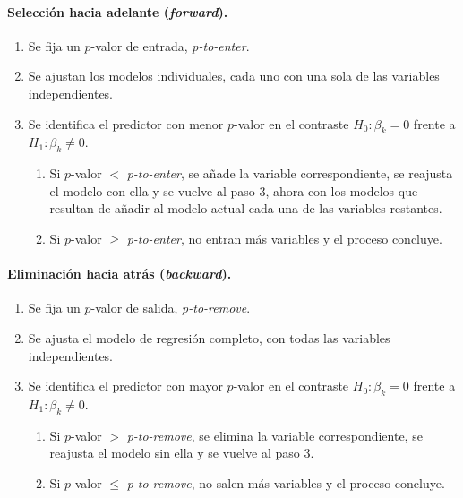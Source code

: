 \paragraph{Selección hacia adelante (\emph{forward}).}
\begin{enumerate}
  \item Se fija un $p$-valor de entrada, \emph{p-to-enter}.
  \item Se ajustan los modelos individuales, cada uno con una sola de las variables
    independientes.
  \item Se identifica el predictor con menor $p$-valor en el contraste $H_0\colon\beta_k=0$ frente
    a $H_1\colon\beta_k\neq0$.
    \begin{enumerate}[label=3.\arabic*.]
      \item Si $p$-valor $<$ \emph{p-to-enter}, se añade la variable correspondiente, se reajusta el
        modelo con ella y se vuelve al paso 3, ahora con los modelos que resultan de añadir al
        modelo actual cada una de las variables restantes.
      \item Si $p$-valor $\ge$ \emph{p-to-enter}, no entran más variables y el proceso concluye.
    \end{enumerate}
\end{enumerate}

\paragraph{Eliminación hacia atrás (\emph{backward}).}
\begin{enumerate}
  \item Se fija un $p$-valor de salida, \emph{p-to-remove}.
  \item Se ajusta el modelo de regresión completo, con todas las variables independientes.
  \item Se identifica el predictor con mayor $p$-valor en el contraste $H_0\colon\beta_k=0$ frente
    a $H_1\colon\beta_k\neq0$.
    \begin{enumerate}[label=3.\arabic*.]
      \item Si $p$-valor $>$ \emph{p-to-remove}, se elimina la variable correspondiente, se
        reajusta el modelo sin ella y se vuelve al paso 3.
      \item Si $p$-valor $\le$ \emph{p-to-remove}, no salen más variables y el proceso concluye.
    \end{enumerate}
\end{enumerate}

